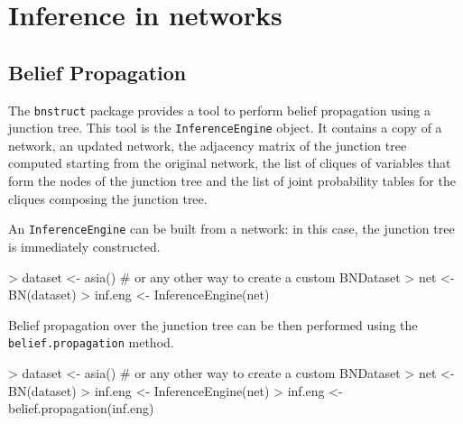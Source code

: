 \documentclass{article}
\newcommand{\Robject}[1]{{\texttt{#1}}}
\newcommand{\Rpackage}[1]{{\texttt{#1}}}
\newcommand{\Rmethod}[1]{{\texttt{#1}}}
\begin{document}
\section{Inference in networks}
\subsection{Belief Propagation}
The \Rpackage{bnstruct} package provides a tool to perform belief propagation using a junction tree.
This tool is the \Robject{InferenceEngine} object.
It contains a copy of a network, an updated network, the adjacency matrix of the junction tree computed
starting from the original network, the list of cliques of variables that form the nodes of the junction tree
and the list of joint probability tables for the cliques composing the junction tree.

An \Robject{InferenceEngine} can be built from a network: in this case, the junction tree is immediately constructed.
\begin{Schunk}
\begin{Sinput}
> dataset <- asia() # or any other way to create a custom BNDataset
> net     <- BN(dataset)
> inf.eng <- InferenceEngine(net)
\end{Sinput}
\end{Schunk}

Belief propagation over the junction tree can be then performed using the \Rmethod{belief.propagation} method.
\begin{Schunk}
\begin{Sinput}
> dataset <- asia() # or any other way to create a custom BNDataset
> net     <- BN(dataset)
> inf.eng <- InferenceEngine(net)
> inf.eng <- belief.propagation(inf.eng)
\end{Sinput}
\end{Schunk}
\end{document}
